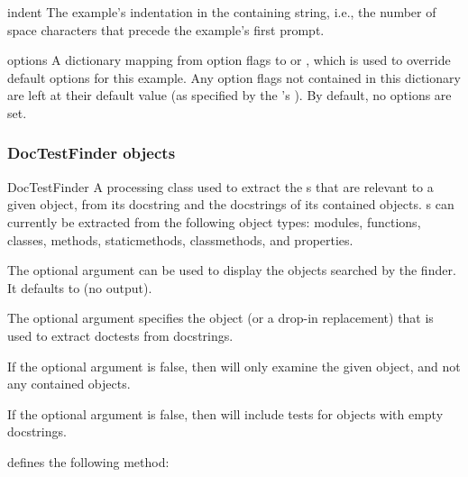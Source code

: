 \begin{memberdesc}{indent}
    The example's indentation in the containing string, i.e., the
    number of space characters that precede the example's first
    prompt.
\end{memberdesc}

\begin{memberdesc}{options}
    A dictionary mapping from option flags to  or
    , which is used to override default options for this
    example.  Any option flags not contained in this dictionary are
    left at their default value (as specified by the
    's ).
    By default, no options are set.
\end{memberdesc}

\subsubsection{DocTestFinder objects\label{doctest-DocTestFinder}}
\begin{classdesc}{DocTestFinder}{}
    A processing class used to extract the s that are
    relevant to a given object, from its docstring and the docstrings
    of its contained objects.  s can currently be
    extracted from the following object types: modules, functions,
    classes, methods, staticmethods, classmethods, and properties.

    The optional argument  can be used to display the
    objects searched by the finder.  It defaults to  (no
    output).

    The optional argument  specifies the
     object (or a drop-in replacement) that is
    used to extract doctests from docstrings.

    If the optional argument  is false, then
     will only examine the given object,
    and not any contained objects.

    If the optional argument  is false, then
     will include tests for objects with
    empty docstrings.

\end{classdesc}

 defines the following method:

